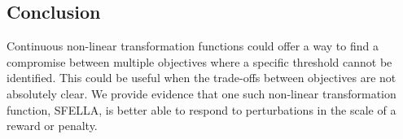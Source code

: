 \subsection{Conclusion}

Continuous non-linear transformation functions could offer a way to find a compromise between multiple objectives where a specific threshold cannot be identified. This could be useful when the trade-offs between objectives are not absolutely clear. We provide evidence that one such non-linear transformation function, SFELLA, is better able to respond to perturbations in the scale of a reward or penalty.